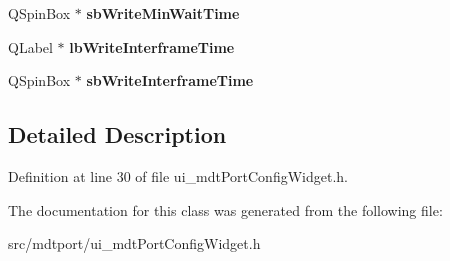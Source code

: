 \begin{DoxyCompactItemize}
\item 
\hypertarget{class_ui__mdt_port_config_widget_a4740ead5e15cd5a13200123494aabdd4}{
QSpinBox $\ast$ {\bfseries sbWriteMinWaitTime}}
\label{class_ui__mdt_port_config_widget_a4740ead5e15cd5a13200123494aabdd4}

\item 
\hypertarget{class_ui__mdt_port_config_widget_ab8640cb5cf95125b496bfbbaff548564}{
QLabel $\ast$ {\bfseries lbWriteInterframeTime}}
\label{class_ui__mdt_port_config_widget_ab8640cb5cf95125b496bfbbaff548564}

\item 
\hypertarget{class_ui__mdt_port_config_widget_afe980ec9ae205856bc2bb476feb91d32}{
QSpinBox $\ast$ {\bfseries sbWriteInterframeTime}}
\label{class_ui__mdt_port_config_widget_afe980ec9ae205856bc2bb476feb91d32}

\end{DoxyCompactItemize}


\subsection{Detailed Description}


Definition at line 30 of file ui\_\-mdtPortConfigWidget.h.



The documentation for this class was generated from the following file:\begin{DoxyCompactItemize}
\item 
src/mdtport/ui\_\-mdtPortConfigWidget.h\end{DoxyCompactItemize}
